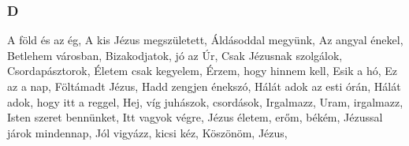 \begin{multicols}{2}
\begin{minipage}{\textwidth}
\subsubsection*{D}
A föld és az ég, \pageref{AfC3B6ldC3A9sazC3A9g}\newline
A kis Jézus megszületett, \pageref{AkisJC3A9zusmegszC3BCletett}\newline
Áldásoddal megyünk, \pageref{C381ldC3A1soddalmegyC3BCnk}\newline
Az angyal énekel, \pageref{AzangyalC3A9nekel}\newline
Betlehem városban, \pageref{BetlehemvC3A1rosban}\newline
Bizakodjatok, jó az Úr, \pageref{Bizakodjatok2CjC3B3azC39Ar}\newline
Csak Jézusnak szolgálok, \pageref{CsakJC3A9zusnakszolgC3A1lok}\newline
Csordapásztorok, \pageref{CsordapC3A1sztorok}\newline
Életem csak kegyelem, \pageref{C389letemcsakkegyelem}\newline
Érzem, hogy hinnem kell, \pageref{C389rzem2Chogyhinnemkell}\newline
Esik a hó, \pageref{EsikahC3B3}\newline
Ez az a nap, \pageref{Ezazanap}\newline
Föltámadt Jézus, \pageref{FC3B6ltC3A1madtJC3A9zus}\newline
Hadd zengjen énekszó, \pageref{HaddzengjenC3A9nekszC3B3}\newline
Hálát adok az esti órán, \pageref{HC3A1lC3A1tadokazestiC3B3rC3A1n}\newline
Hálát adok, hogy itt a reggel, \pageref{HC3A1lC3A1tadok2Chogyittareggel}\newline
Hej, víg juhászok, csordások, \pageref{Hej2CvC3ADgjuhC3A1szok2CcsordC3A1sok}\newline
Irgalmazz, Uram, irgalmazz, \pageref{Irgalmazz2CUram2Cirgalmazz}\newline
Isten szeret bennünket, \pageref{IstenszeretbennC3BCnket}\newline
Itt vagyok végre, \pageref{IttvagyokvC3A9gre}\newline
Jézus életem, erőm, békém, \pageref{JC3A9zusC3A9letem2CerC591m2CbC3A9kC3A9m}\newline
Jézussal járok mindennap, \pageref{JC3A9zussaljC3A1rokmindennap}\newline
Jól vigyázz, kicsi kéz, \pageref{JC3B3lvigyC3A1zz2CkicsikC3A9z}\newline
Köszönöm, Jézus, \pageref{KC3B6szC3B6nC3B6m2CJC3A9zus}\newline

\end{minipage}
\end{multicols}
